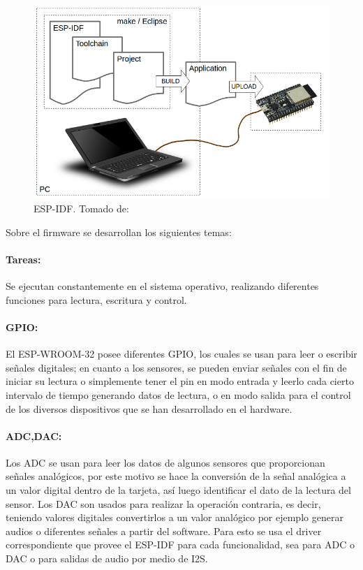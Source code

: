 \begin{figure}[H]
	\centering
	\caption[ESP-IDF.]{ESP-IDF. Tomado de: \cite{ES}}
	\label{fig:what-you-need}
	\includegraphics[width=0.5\linewidth]{Imagenes/what-you-need}
\end{figure}


Sobre el firmware se desarrollan los siguientes temas:

\paragraph{Tareas:}

Se ejecutan constantemente en el sistema operativo, realizando diferentes funciones para lectura, escritura y control.

\paragraph{GPIO:}

El ESP-WROOM-32 posee diferentes GPIO, los cuales se usan para leer o escribir señales digitales; en cuanto a los sensores, se pueden enviar señales con el fin de iniciar su lectura o simplemente tener el pin en modo entrada y leerlo cada cierto intervalo de tiempo generando datos de lectura, o en modo salida para el control de los diversos dispositivos que se han desarrollado en el hardware.

\paragraph{ADC,DAC:}

Los ADC se usan para leer los datos de algunos sensores que proporcionan señales analógicos, por este motivo se hace la conversión de la señal analógica a un valor digital dentro de la tarjeta, así luego identificar el dato de la lectura del sensor. Los DAC son usados para realizar la operación contraria, es decir, teniendo valores digitales convertirlos a un valor analógico por ejemplo generar audios o diferentes señales a partir del software. Para esto se usa el driver correspondiente que provee el ESP-IDF para cada funcionalidad, sea para ADC o DAC o para salidas de audio por medio de I2S.

